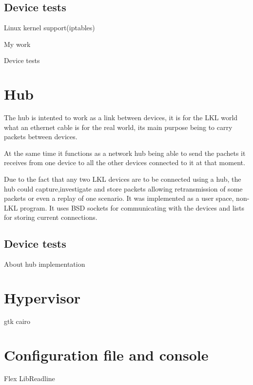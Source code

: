 \subsection{Device tests}
\label{sub-sec:nat-tests}
Linux kernel support(iptables)

My work

Device tests

\section{Hub}
\label{sec:hub:impl}

The hub is intented to work as a link between devices, it is for the LKL world what an ethernet cable is for the real world, its main purpose being to carry packets between devices.

At the same time it functions as a network hub being able to send the pachets it receives from one device to all the other devices connected to it at that moment.

Due to the fact that any two LKL devices are to be connected using a hub, the hub could capture,investigate and store packets allowing retransmission of some packets or even a replay of one scenario.  
It was implemented as a user space, non-LKL program. It uses BSD sockets for communicating with the devices and lists for storing current connections.
\subsection{Device tests}
\label{sub-sec:router-tests}
About hub implementation

\section{Hypervisor}
\label{sec:hypervisor}
gtk 
cairo

\section{Configuration file and console}
\label{sec:config}
Flex
LibReadline
